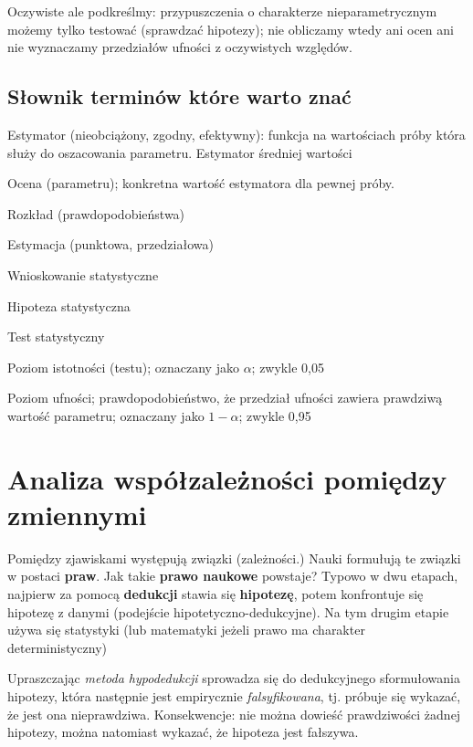 \documentclass[
  openany]{book}
\begin{document}
Oczywiste ale podkreślmy: przypuszczenia o charakterze nieparametrycznym
możemy tylko testować (sprawdzać hipotezy);
nie obliczamy wtedy ani ocen ani nie wyznaczamy przedziałów ufności
z oczywistych względów.

\hypertarget{sux142ownik-terminuxf3w-ktuxf3re-warto-znaux107}{%
\section{Słownik terminów które warto znać}\label{sux142ownik-terminuxf3w-ktuxf3re-warto-znaux107}}

Estymator (nieobciążony, zgodny, efektywny): funkcja na wartościach próby która służy
do oszacowania parametru. Estymator średniej wartości

Ocena (parametru); konkretna wartość estymatora dla pewnej próby.

Rozkład (prawdopodobieństwa)

Estymacja (punktowa, przedziałowa)

Wnioskowanie statystyczne

Hipoteza statystyczna

Test statystyczny

Poziom istotności (testu); oznaczany jako \(\alpha\); zwykle 0,05

Poziom ufności; prawdopodobieństwo, że przedział ufności zawiera prawdziwą wartość parametru;
oznaczany jako \(1- \alpha\); zwykle 0,95

\hypertarget{causality}{%
\chapter{Analiza współzależności pomiędzy zmiennymi}\label{causality}}

Pomiędzy zjawiskami występują związki (zależności.) Nauki formułują te związki
w postaci \textbf{praw}. Jak takie \textbf{prawo naukowe} powstaje? Typowo w dwu etapach,
najpierw za pomocą \textbf{dedukcji} stawia się \textbf{hipotezę}, potem konfrontuje się
hipotezę z danymi (podejście hipotetyczno-dedukcyjne).
Na tym drugim etapie używa się statystyki (lub matematyki jeżeli prawo ma charakter deterministyczny)

Upraszczając \emph{metoda hypodedukcji} sprowadza się do dedukcyjnego sformułowania hipotezy, która następnie jest empirycznie \emph{falsyfikowana}, tj. próbuje się wykazać, że jest ona nieprawdziwa. Konsekwencje:
nie można dowieść prawdziwości żadnej hipotezy, można natomiast wykazać, że
hipoteza jest fałszywa.
\end{document}
